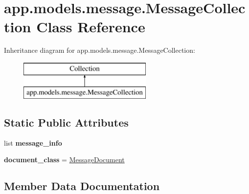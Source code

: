 \hypertarget{classapp_1_1models_1_1message_1_1_message_collection}{}\section{app.\+models.\+message.\+Message\+Collection Class Reference}
\label{classapp_1_1models_1_1message_1_1_message_collection}
Inheritance diagram for app.\+models.\+message.\+Message\+Collection\+:\begin{figure}[H]
\begin{center}
\leavevmode
\includegraphics[height=2.000000cm]{classapp_1_1models_1_1message_1_1_message_collection}
\end{center}
\end{figure}
\subsection*{Static Public Attributes}
\begin{DoxyCompactItemize}
\item 
list {\bfseries message\+\_\+info}
\item 
\mbox{\label{classapp_1_1models_1_1message_1_1_message_collection_a96ec67502ec7ef3edfd24f83a0467dfb}} 
{\bfseries document\+\_\+class} = \hyperlink{classapp_1_1models_1_1message_1_1_message_document}{Message\+Document}
\end{DoxyCompactItemize}


\subsection{Member Data Documentation}
\mbox{\label{classapp_1_1models_1_1message_1_1_message_collection_ac6ea8ff3ac08eb3bb9fd67d756b25075}} 
